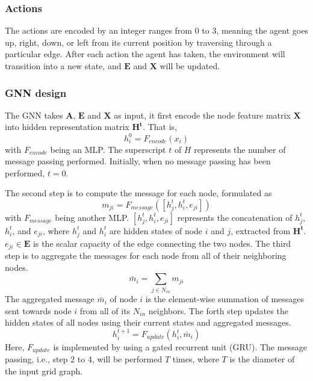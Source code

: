 \documentclass[letterpaper]{article}
\begin{document}
\subsubsection{Actions}
The actions are encoded by an integer ranges from 0 to 3, meaning the agent goes
up, right, down, or left from its current position by traversing through a
particular edge. After each action the agent has taken, the environment will
transition into a new state, and $\mathbf{E}$ and $\mathbf{X}$ will be updated.

\subsubsection{GNN design}
The GNN takes $\mathbf{A}$, $\mathbf{E}$ and $\mathbf{X}$ as input, it first
encode the node feature matrix $\mathbf{X}$ into hidden representation matrix
$\mathbf{H^t}$. That is,
\begin{equation}
    h_i^0 = F_{encode}(x_i)
\end{equation}
with $F_{encode}$ being an MLP. The superscript $t$ of $H$ represents the number
of message passing performed. Initially, when no message passing has been
performed, $t=0$. 

The second step is to compute the message for each node, formulated as 
\begin{equation}
    m_{ji} = F_{message}([h_j^t, h_i^t, e_{ji}])
\end{equation}
with $F_{message}$ being another MLP. $[h_j^t, h_i^t, e_{ji}]$ represents the
concatenation of $h_j^t$, $h_i^t$, and $e_{ji}$, where $h_j^t$ and $h_i^t$ are
hidden states of node $i$ and $j$, extracted from $\mathbf{H^t}$. $e_{ji}\in
\mathbf{E}$ is the scalar capacity of the edge connecting the two nodes. The
third step is to aggregate the messages for each node from all of their
neighboring nodes. 
\begin{equation}
    \bar{m}_{i} = \sum_{j\in N_{in}} m_{ji}
\end{equation}
The aggregated message $\bar{m}_{i}$ of node $i$ is the element-wise summation
of messages sent towards node $i$ from all of its $N_{in}$ neighbors. The forth
step updates the hidden states of all nodes using their current states and
aggregated messages. 
\begin{equation}
    h_{i}^{t+1} = F_{update}(h_{i}^t, \bar{m}_{i})
\end{equation}
Here, $F_{update}$ is implemented by using a gated recurrent unit (GRU). The
message passing, i.e., step 2 to 4, will be performed $T$ times, where $T$ is
the diameter of the input grid graph. 
\end{document}
